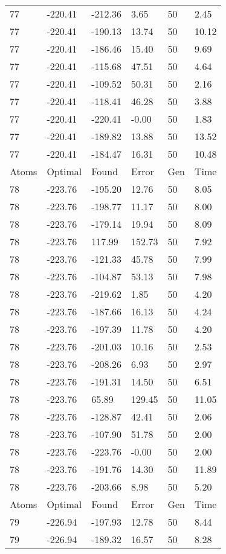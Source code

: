 \documentclass{report}
\begin{document}
\begin{appendix}
\begin{longtable}{llllll}
77 & -220.41 & -212.36 & 3.65 & 50 & 2.45 \\
77 & -220.41 & -190.13 & 13.74 & 50 & 10.12 \\
77 & -220.41 & -186.46 & 15.40 & 50 & 9.69 \\
77 & -220.41 & -115.68 & 47.51 & 50 & 4.64 \\
77 & -220.41 & -109.52 & 50.31 & 50 & 2.16 \\
77 & -220.41 & -118.41 & 46.28 & 50 & 3.88 \\
77 & -220.41 & -220.41 & -0.00 & 50 & 1.83 \\
77 & -220.41 & -189.82 & 13.88 & 50 & 13.52 \\
77 & -220.41 & -184.47 & 16.31 & 50 & 10.48 \\
Atoms & Optimal & Found & Error & Gen & Time \\
78 & -223.76 & -195.20 & 12.76 & 50 & 8.05 \\
78 & -223.76 & -198.77 & 11.17 & 50 & 8.00 \\
78 & -223.76 & -179.14 & 19.94 & 50 & 8.09 \\
78 & -223.76 & 117.99 & 152.73 & 50 & 7.92 \\
78 & -223.76 & -121.33 & 45.78 & 50 & 7.99 \\
78 & -223.76 & -104.87 & 53.13 & 50 & 7.98 \\
78 & -223.76 & -219.62 & 1.85 & 50 & 4.20 \\
78 & -223.76 & -187.66 & 16.13 & 50 & 4.24 \\
78 & -223.76 & -197.39 & 11.78 & 50 & 4.20 \\
78 & -223.76 & -201.03 & 10.16 & 50 & 2.53 \\
78 & -223.76 & -208.26 & 6.93 & 50 & 2.97 \\
78 & -223.76 & -191.31 & 14.50 & 50 & 6.51 \\
78 & -223.76 & 65.89 & 129.45 & 50 & 11.05 \\
78 & -223.76 & -128.87 & 42.41 & 50 & 2.06 \\
78 & -223.76 & -107.90 & 51.78 & 50 & 2.00 \\
78 & -223.76 & -223.76 & -0.00 & 50 & 2.00 \\
78 & -223.76 & -191.76 & 14.30 & 50 & 11.89 \\
78 & -223.76 & -203.66 & 8.98 & 50 & 5.20 \\
Atoms & Optimal & Found & Error & Gen & Time \\
79 & -226.94 & -197.93 & 12.78 & 50 & 8.44 \\
79 & -226.94 & -189.32 & 16.57 & 50 & 8.28 \\

\end{longtable}
\end{appendix}
\end{document}

